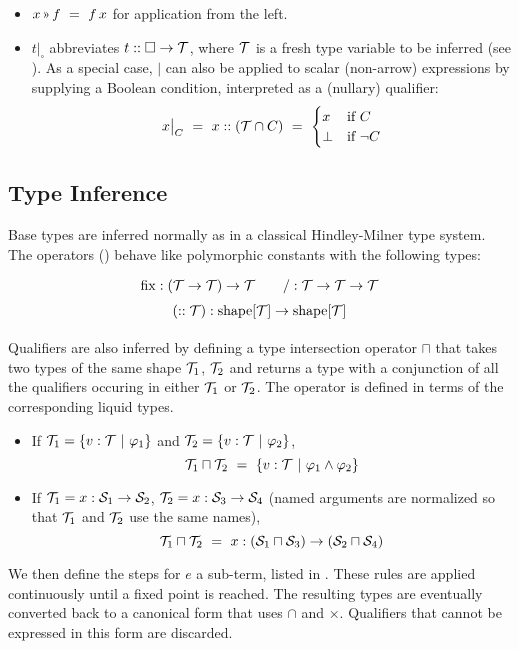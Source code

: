 \begin{itemize}
  \item $x \applt f ~=~ f\,x$ for application from the left.
  \item $t\big|_{\square}$ abbreviates $t::\square\to\mathcal{T}$, where $\mathcal{T}$ is a fresh type variable
    to be inferred (see ). As a special case, $\big|$ can also be applied
    to scalar (non-arrow) expressions by supplying a Boolean condition,
    interpreted as a (nullary) qualifier:
    \[x\big|_{C} ~=~ x :: (\mathcal{T}\cap C) ~=~ \begin{cases}x & \mbox{if }C \\ \bot & \mbox{if }\lnot C\end{cases}\]
\end{itemize}

\subsection{Type Inference}
\label{lang:type inf}

Base types are inferred normally as in a classical Hindley-Milner type system.
The operators () behave like polymorphic
constants with the following types:
\[\renewcommand\arraystretch{1.5}
  \begin{array}{c}
    {\fix} : (\T\to\T)\to\T \qquad {/} : \T\to\T\to\T \\
    (::\T) : \mathrm{shape}[\T]\to\mathrm{shape}[\T]
  \end{array}\]


Qualifiers are also inferred by defining a type intersection operator $\sqcap$ that
takes two types of the same shape $\mathcal{T}_1$, $\mathcal{T}_2$ and returns a type with a conjunction of all the qualifiers
occuring in either $\mathcal{T}_1$ or $\mathcal{T}_2$. The operator is defined in terms of the corresponding liquid types.
\begin{itemize}
  \item If $\mathcal{T}_1=\{v:\mathcal{T} ~|~ \varphi_1\}$ and $\mathcal{T}_2=\{v:\mathcal{T} ~|~ \varphi_2\}$,
	\[\mathcal{T}_1\sqcap\mathcal{T}_2 ~=~ \{v:\mathcal{T} ~|~ \varphi_1\land\varphi_2\}\]
  \item If $\mathcal{T}_1=x:\mathcal{S}_1\to\mathcal{S}_2$, $\mathcal{T}_2=x:\mathcal{S}_3\to\mathcal{S}_4$ (named arguments are normalized so that $\mathcal{T}_1$ and $\mathcal{T}_2$ use the same names),
    \[\mathcal{T}_1\sqcap\mathcal{T}_2 ~=~ x:(\mathcal{S}_1\sqcap\mathcal{S}_3)\to(\mathcal{S}_2\sqcap\mathcal{S}_4)\]
\end{itemize}

We then define the  steps for $e$ a sub-term, listed in .
These rules are applied continuously until a fixed point is reached.
The resulting types are eventually converted back to a canonical form that uses $\cap$ and $\times$.
Qualifiers that cannot be expressed in this form are discarded.

